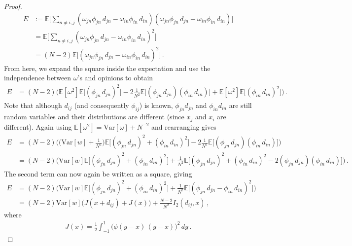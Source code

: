 \documentclass{article}
\newcommand{\EE}{\mathds{E}}
\newcommand{\var}{\text{Var}}
\begin{document}
\begin{proof}
    \begin{align*}
        E &:= \EE\Bigg[\sum_{n\neq i,j} (\omega_{jn}\phi_{jn} \, d_{jn} - \omega_{in}\phi_{in} \, d_{in})(\omega_{jn}\phi_{jn} \, d_{jn} - \omega_{in}\phi_{in} \, d_{in}) \Bigg] \\
        &= \EE\Bigg[\sum_{n\neq i,j} (\omega_{jn}\phi_{jn} \, d_{jn} - \omega_{in}\phi_{in} \, d_{in})^2 \Bigg] \\
        &= (N-2) \EE\Big[(\omega_{jn}\phi_{jn} \, d_{jn} - \omega_{in}\phi_{in} \, d_{in})^2 \Big] \,.
    \end{align*}
    From here, we expand the square inside the expectation and use the independence between $\omega$'s and opinions to obtain
    \begin{align*}
        E&= (N-2) \bigg( \EE[\omega^2] \EE\Big[(\phi_{jn} \, d_{jn})^2 \Big]  - 2 \frac{1}{N^2} \EE\Big[(\phi_{jn} \, d_{jn}) (\phi_{in} \, d_{in})\Big] + \EE[\omega^2] \EE\Big[(\phi_{in} \, d_{in})^2 \Big] \bigg) \,.
    \end{align*}
    Note that although $d_{ij}$ (and consequently $\phi_{ij}$) is known, $\phi_{jn} d_{jn}$ and $\phi_{in} d_{in}$ are still random variables and their distributions are different (since $x_j$ and $x_i$ are different). Again using $\EE[\omega^2]=\var[\omega] + N^{-2}$ and rearranging gives 
    \begin{align*}
        E &= (N-2) \bigg( \Big(\var[w]+\frac{1}{N^2}\Big) \EE\Big[(\phi_{jn} \, d_{jn})^2 + (\phi_{in} \, d_{in})^2  \Big]  - 2 \frac{1}{N^2} \EE\Big[(\phi_{jn} \, d_{jn}) (\phi_{in} \, d_{in})\Big] \bigg) \\
        &= (N-2) \bigg( \var[w] \EE\Big[(\phi_{jn} \, d_{jn})^2 + (\phi_{in} \, d_{in})^2  \Big] + \frac{1}{N^2} \EE\Big[(\phi_{jn} \, d_{jn})^2 + (\phi_{in} \, d_{in})^2  -2(\phi_{jn} \, d_{jn}) (\phi_{in} \, d_{in})\Big] \bigg) \,.
    \end{align*}
    The second term can now again be written as a square, giving 
    \begin{align*}
        E &= (N-2) \bigg( \var[w] \EE\Big[(\phi_{jn} \, d_{jn})^2 + (\phi_{in} \, d_{in})^2 \Big] + \frac{1}{N^2} \EE\Big[(\phi_{jn} \, d_{jn} -\phi_{in} \, d_{in})^2 \Big] \bigg) \\
        &= (N-2) \var[w] \Big(J(x + d_{ij}) + J(x) \Big) + \frac{N-2}{N^2} I_2(d_{ij},x) \,,
    \end{align*}
    where
    \begin{align*}
        J(x) = \frac{1}{2} \int_{-1}^1 \Big(\phi(y-x)\,(y-x) \Big)^2 \, dy \,.
    \end{align*}
    

\end{proof}
\end{document}
